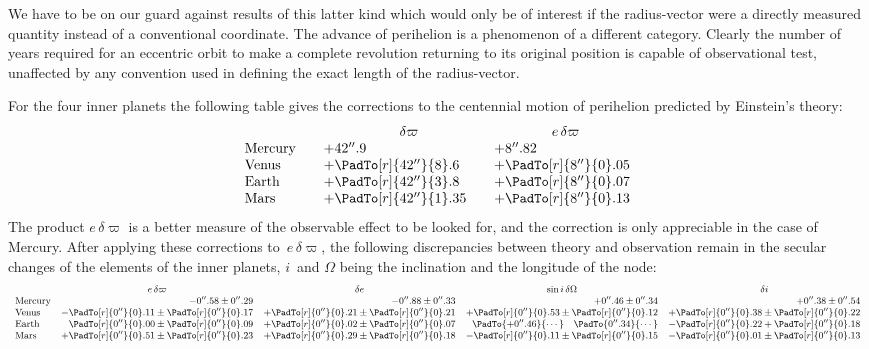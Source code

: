 \documentclass[12pt]{book}
\begin{document}
We have to be on our guard against results of this latter kind which would
only be of interest if the radius\hyp{}vector were a directly measured quantity instead
of a conventional coordinate. The advance of perihelion is a phenomenon
of a different category. Clearly the number of years required for an eccentric
orbit to make a complete revolution returning to its original position is capable
of observational test, unaffected by any convention used in defining the exact
length of the radius\hyp{}vector.

For the four inner planets the following table gives the corrections to the
%
%
centennial motion of perihelion predicted by Einstein's theory:
\[
\begin{array}{l@{\qquad}l@{\qquad}l}
  & \multicolumn{1}{c}{\delta\varpi} & \multicolumn{1}{c}{e\, \delta\varpi} \\
\text{Mercury} & +42''.9 & +8''.82 \\
\text{Venus} & +\PadTo[r]{42''}{8}.6 & +\PadTo[r]{8''}{0}.05 \\
\text{Earth} & +\PadTo[r]{42''}{3}.8 & +\PadTo[r]{8''}{0}.07 \\
\text{Mars}  & +\PadTo[r]{42''}{1}.35& +\PadTo[r]{8''}{0}.13 \\
\end{array}
\]
The product $e\, \delta\varpi$ is a better measure of the observable effect to be looked for,
and the correction is only appreciable in the case of Mercury. After applying
these corrections to~$e\, \delta\varpi$, the following discrepancies between theory and observation
remain in the secular changes of the elements of the inner planets,
$i$~and $\Omega$ being the inclination and the longitude of the node:
\[
\small
\begin{array}{lrrrr}
  & \multicolumn{1}{c}{e\, \delta\varpi} & \multicolumn{1}{c}{\delta e} & \multicolumn{1}{c}{\sin i\, \delta\Omega} & \multicolumn{1}{c}{\delta i} \\
  \text{Mercury} &
  -0''.58 \pm 0''.29 & -0''.88 \pm 0''.33 & +0''.46 \pm 0''.34 & +0''.38 \pm 0''.54 \\
  \text{Venus}   &
  -\PadTo[r]{0''}{0}.11 \pm \PadTo[r]{0''}{0}.17 & +\PadTo[r]{0''}{0}.21 \pm \PadTo[r]{0''}{0}.21 & +\PadTo[r]{0''}{0}.53 \pm \PadTo[r]{0''}{0}.12 & + \PadTo[r]{0''}{0}.38 \pm \PadTo[r]{0''}{0}.22 \\
  \text{Earth}   & \PadTo[r]{0''}{0}.00 \pm \PadTo[r]{0''}{0}.09 & +\PadTo[r]{0''}{0}.02 \pm \PadTo[r]{0''}{0}.07 & \PadTo{+0''.46}{\cdots} \quad \PadTo{0''.34}{\cdots} & -\PadTo[r]{0''}{0}.22 + \PadTo[r]{0''}{0}.18 \\
  \text{Mars}    & +\PadTo[r]{0''}{0}.51 \pm \PadTo[r]{0''}{0}.23 & +\PadTo[r]{0''}{0}.29 \pm \PadTo[r]{0''}{0}.18 & -\PadTo[r]{0''}{0}.11 \pm \PadTo[r]{0''}{0}.15 & -\PadTo[r]{0''}{0}.01 \pm \PadTo[r]{0''}{0}.13 \\
\end{array}
\]
\end{document}
